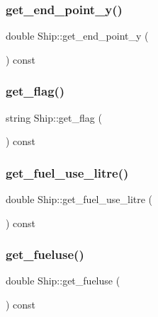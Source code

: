 \mbox{\label{class_ship_ab18f349fe24009bae6acbeb93f3374f1}} 
\subsubsection{\texorpdfstring{get\_end\_point\_y()}{get\_end\_point\_y()}}
{\footnotesize\ttfamily double Ship\+::get\+\_\+end\+\_\+point\+\_\+y (\begin{DoxyParamCaption}{ }\end{DoxyParamCaption}) const}

\mbox{\label{class_ship_a901e3a79889183f5b52b0c5efaf191c9}} 
\subsubsection{\texorpdfstring{get\_flag()}{get\_flag()}}
{\footnotesize\ttfamily string Ship\+::get\+\_\+flag (\begin{DoxyParamCaption}{ }\end{DoxyParamCaption}) const}

\mbox{\label{class_ship_a3341ae3493ea474573cef1ee4050c06a}} 
\subsubsection{\texorpdfstring{get\_fuel\_use\_litre()}{get\_fuel\_use\_litre()}}
{\footnotesize\ttfamily double Ship\+::get\+\_\+fuel\+\_\+use\+\_\+litre (\begin{DoxyParamCaption}{ }\end{DoxyParamCaption}) const}

\mbox{\label{class_ship_ada93b23a03f80baa2e148cc24d628a7d}} 
\subsubsection{\texorpdfstring{get\_fueluse()}{get\_fueluse()}}
{\footnotesize\ttfamily double Ship\+::get\+\_\+fueluse (\begin{DoxyParamCaption}{ }\end{DoxyParamCaption}) const}


